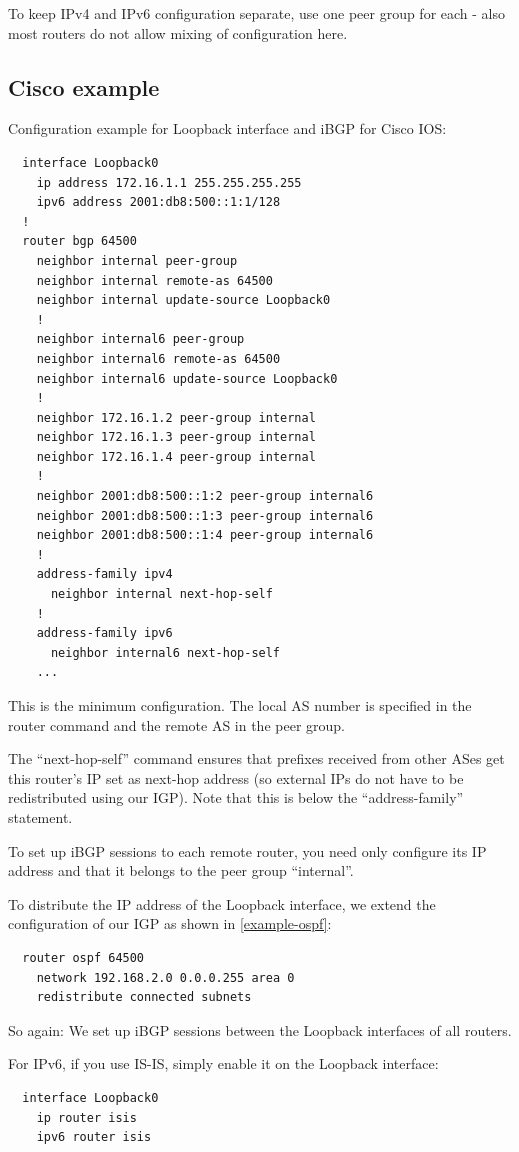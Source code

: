 To keep IPv4 and IPv6 configuration separate, use one peer group for each - also most routers do not allow mixing of configuration here.

\subsection{Cisco example}
Configuration example for Loopback interface and iBGP for Cisco IOS:
\begin{verbatim}
  interface Loopback0
    ip address 172.16.1.1 255.255.255.255
    ipv6 address 2001:db8:500::1:1/128
  !
  router bgp 64500
    neighbor internal peer-group
    neighbor internal remote-as 64500
    neighbor internal update-source Loopback0
    !
    neighbor internal6 peer-group
    neighbor internal6 remote-as 64500
    neighbor internal6 update-source Loopback0
    !
    neighbor 172.16.1.2 peer-group internal
    neighbor 172.16.1.3 peer-group internal
    neighbor 172.16.1.4 peer-group internal
    !
    neighbor 2001:db8:500::1:2 peer-group internal6
    neighbor 2001:db8:500::1:3 peer-group internal6
    neighbor 2001:db8:500::1:4 peer-group internal6
    !
    address-family ipv4
      neighbor internal next-hop-self
    !
    address-family ipv6
      neighbor internal6 next-hop-self
    ...
\end{verbatim}
This is the minimum configuration. The local AS number is specified in the router command and the remote AS in the peer group.

The ``next-hop-self'' command ensures that prefixes received from other ASes  get this router's IP set as next-hop address (so external IPs do not have to be redistributed using our IGP). Note that this is below the ``address-family'' statement.

To set up iBGP sessions to each remote router, you need only configure its IP address and that it belongs to the peer group ``internal''.

To distribute the IP address of the Loopback interface, we extend the configuration of our IGP as shown in \ref{example-ospf}:
\begin{verbatim}
  router ospf 64500
    network 192.168.2.0 0.0.0.255 area 0
    redistribute connected subnets
\end{verbatim}
So again: We set up iBGP sessions between the Loopback interfaces of all routers.

For IPv6, if you use IS-IS, simply enable it on the Loopback interface:
\begin{verbatim}
  interface Loopback0
    ip router isis
    ipv6 router isis
\end{verbatim}

